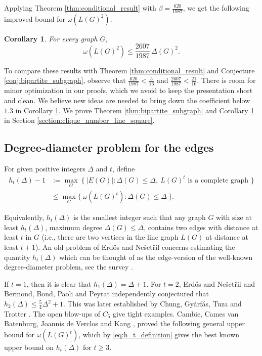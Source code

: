 \documentclass[11pt]{article}
\theoremstyle{plain}
\newtheorem{corollary}[theorem]{Corollary}
\numberwithin{equation}{section}
\begin{document}
Applying Theorem \ref{thm:conditional_result} with $\beta =\frac{620}{1987}$, we get the following improved bound for $\omega(L(G)^2)$. 

\begin{corollary}\label{cor:omega_line_square}
For every graph $G$,
\[
   \omega(L(G)^2)
   \le \frac{2607}{1987}\,\Delta(G)^2.
\]
\end{corollary}

To compare these results with Theorem \ref{thm:conditional_result} and Conjecture \ref{conj:bipartite_subgraph}, observe that $\frac{620}{1987} < \frac{5}{16}$ and $\frac{2607}{1987}<\frac{21}{16}$. There is room for minor optimization in our proofs, which we avoid to keep the presentation short and clean. We believe new ideas are needed to bring down the coefficient below $1.3$ in Corollary \ref{cor:omega_line_square}. We prove Theorem \ref{thm:bipartite_subgraph} and Corollary \ref{cor:omega_line_square} in Section \ref{section:clique_number_line_square}.

\subsection{Degree-diameter problem for the edges}

For given positive integers $\Delta$ and $t$, define
\begin{align}\label{eq:h_t_definition}
     h_t(\Delta) - 1& :=\max_G \ \{ \ |E(G)|: \Delta(G)\le \Delta, \ L(G)^t \text{ is a complete graph }\}\nonumber\\
     & \le \max_G \{ \ \omega(L(G)^t): \Delta(G)\le \Delta \ \}.
\end{align}

Equivalently, $h_t(\Delta)$ is the smallest integer such that any graph $G$ with size at least $h_t(\Delta)$, maximum degree $\Delta(G)\le \Delta$, contains two edges with distance at least $t$ in $G$ (i.e., there are two vertices in the line graph $L(G)$ at distance at least $t+1$). An old problem of Erd\H{o}s and Ne\v{s}et\v{r}il \cite{Erdos_1986} concerns estimating the quantity $h_t(\Delta)$ which can be thought of as the edge-version of the well-known degree-diameter problem, see the survey \cite{Miller_Siran_2005}. 

If $t=1$, then it is clear that $h_1(\Delta) = \Delta + 1$. For $t = 2$, Erd\H{o}s and Ne\v{s}et\v{r}il \cite{Erdos_1986} and Bermond, Bond, Paoli and Peyrat \cite{Bermond_Bond_Paoli_Peyrat_1983} independently conjectured that $h_2(\Delta) \le \frac{5}{4}\Delta^2 + 1$. This was later established by Chung, Gy\'{a}rf\'{a}s, Tuza and Trotter \cite{Chung_Gyarfas_Tuza_Trotter_1990}. The open blow-ups of $C_5$ give tight examples. Cambie, Cames van Batenburg, Joannis de Verclos and Kang \cite{Cambie_Batenburg_Verclos_Kang_2022}, proved the following general upper bound for $\omega(L(G)^t)$, which by \eqref{eq:h_t_definition} gives the best known upper bound on $h_t(\Delta)$ for $t\ge 3$. 
\end{document}
